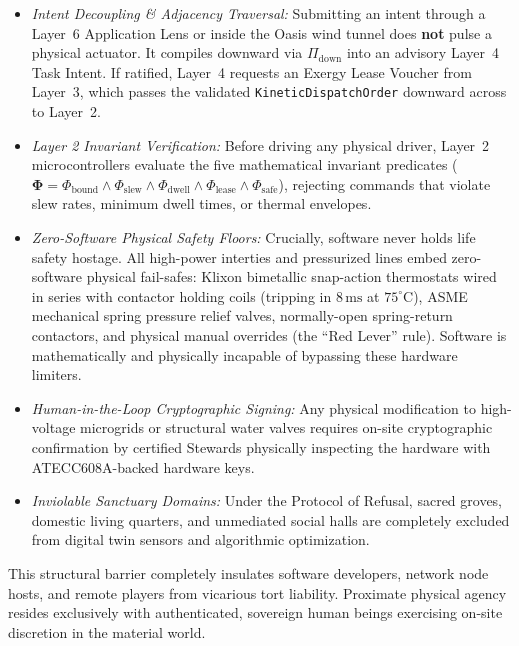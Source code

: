 \begin{enumerate}
    \begin{itemize}
        \item \textit{Intent Decoupling \& Adjacency Traversal:} Submitting an intent through a Layer~6 Application Lens or inside the Oasis wind tunnel does \textbf{not} pulse a physical actuator. It compiles downward via $\Pi_{\mathrm{down}}$ into an advisory Layer~4 Task Intent. If ratified, Layer~4 requests an Exergy Lease Voucher from Layer~3, which passes the validated \texttt{KineticDispatchOrder} downward across  to Layer~2.
        \item \textit{Layer 2 Invariant Verification:} Before driving any physical driver, Layer~2 microcontrollers evaluate the five mathematical invariant predicates ($\mathbf{\Phi} = \Phi_{\mathrm{bound}} \land \Phi_{\mathrm{slew}} \land \Phi_{\mathrm{dwell}} \land \Phi_{\mathrm{lease}} \land \Phi_{\mathrm{safe}}$), rejecting commands that violate slew rates, minimum dwell times, or thermal envelopes.
        \item \textit{Zero-Software Physical Safety Floors:} Crucially, software never holds life safety hostage. All high-power interties and pressurized lines embed zero-software physical fail-safes: Klixon bimetallic snap-action thermostats wired in series with contactor holding coils (tripping in $8\,\mathrm{ms}$ at $75^\circ\mathrm{C}$), ASME mechanical spring pressure relief valves, normally-open spring-return contactors, and physical manual overrides (the ``Red Lever'' rule). Software is mathematically and physically incapable of bypassing these hardware limiters.
        \item \textit{Human-in-the-Loop Cryptographic Signing:} Any physical modification to high-voltage microgrids or structural water valves requires on-site cryptographic confirmation by certified Stewards physically inspecting the hardware with ATECC608A-backed hardware keys.
        \item \textit{Inviolable Sanctuary Domains:} Under the Protocol of Refusal, sacred groves, domestic living quarters, and unmediated social halls are completely excluded from digital twin sensors and algorithmic optimization.
    \end{itemize}
\end{enumerate}

This structural barrier completely insulates software developers, network node hosts, and remote players from vicarious tort liability. Proximate physical agency resides exclusively with authenticated, sovereign human beings exercising on-site discretion in the material world.


